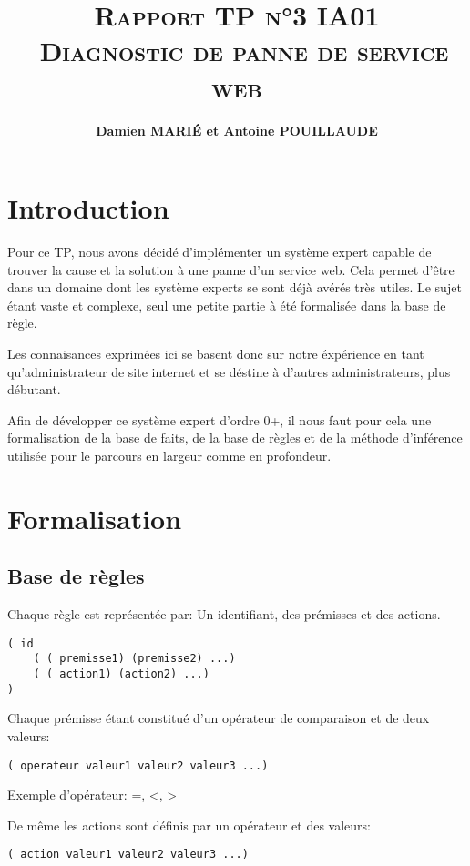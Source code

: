 \documentclass[a4paper, 10pt, leqno]{report}
\title{\textsc{\textbf{Rapport TP n°3 IA01 \\ Diagnostic de panne de service web}}}
\author{\textbf{Damien MARI\'E et Antoine POUILLAUDE}}
\theoremstyle{plain}
\begin{document}
    \maketitle
    \tableofcontents

\chapter*{Introduction}

Pour ce TP, nous avons décidé d'implémenter un système expert capable de trouver la cause et la solution à une panne d'un service web. Cela permet d'être dans un domaine dont les système experts se sont déjà avérés très utiles. Le sujet étant vaste et complexe, seul une petite partie à été formalisée dans la base de règle.

Les connaisances exprimées ici se basent donc sur notre éxpérience en tant qu'administrateur de site internet et se déstine à d'autres administrateurs, plus débutant.

Afin de développer ce système expert d'ordre 0+, il nous faut pour cela une formalisation de la base de faits, de la base de règles et de la méthode d'inférence utilisée pour le parcours en largeur comme en profondeur.

\chapter{Formalisation}

\section{Base de règles}

Chaque règle est représentée par: Un identifiant, des prémisses et des actions.

\begin{lstlisting}
( id
	( ( premisse1) (premisse2) ...)
	( ( action1) (action2) ...)
)
\end{lstlisting}

Chaque prémisse étant constitué d'un opérateur de comparaison et de deux valeurs:

\begin{lstlisting}
( operateur valeur1 valeur2 valeur3 ...)
\end{lstlisting}

Exemple d'opérateur: =, <, >

De même les actions sont définis par un opérateur et des valeurs:
\begin{lstlisting}
( action valeur1 valeur2 valeur3 ...)
\end{lstlisting}
\end{document}
